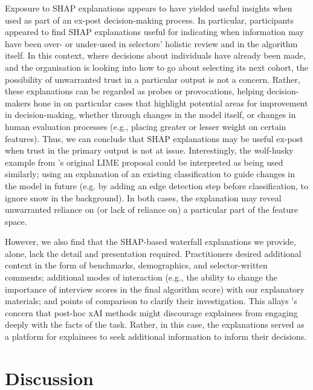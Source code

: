 Exposure to SHAP explanations appears to have yielded useful insights when used as part of an ex-post decision-making process. In particular, participants appeared to find SHAP explanations useful for indicating when information may have been over- or under-used in selectors' holistic review and in the algorithm itself. In this context, where decisions about individuals have already been made, and the organisation is looking into how to go about selecting its next cohort, the possibility of unwarranted trust in a particular output is not a concern. Rather, these explanations can be regarded as probes or provocations, helping decision-makers hone in on particular cases that highlight potential areas for improvement in decision-making, whether through changes in the model itself, or changes in human evaluation processes (e.g., placing greater or lesser weight on certain features). Thus, we can conclude that SHAP explanations may be useful ex-post when trust in the primary output is not at issue. Interestingly, the wolf-husky example from \textcite{ribeiro_why_2016}'s original LIME proposal could be interpreted as being used similarly; using an explanation of an existing classification to guide changes in the model in future (e.g. by adding an edge detection step before classification, to ignore snow in the background). In both cases, the explanation may reveal unwarranted reliance on (or lack of reliance on) a particular part of the feature space.

However, we also find that the SHAP-based waterfall explanations we provide, alone, lack the detail and presentation required. Practitioners desired additional context in the form of benchmarks, demographics, and selector-written comments; additional modes of interaction (e.g., the ability to change the importance of interview scores in the final algorithm score) with our explanatory materials; and points of comparison to clarify their investigation. This allays \textcite{miller_explainable_2023}'s concern that post-hoc xAI methods might discourage explainees from engaging deeply with the facts of the task. Rather, in this case, the explanations served as a platform for explainees to seek additional information to inform their decisions.


\section{Discussion}
